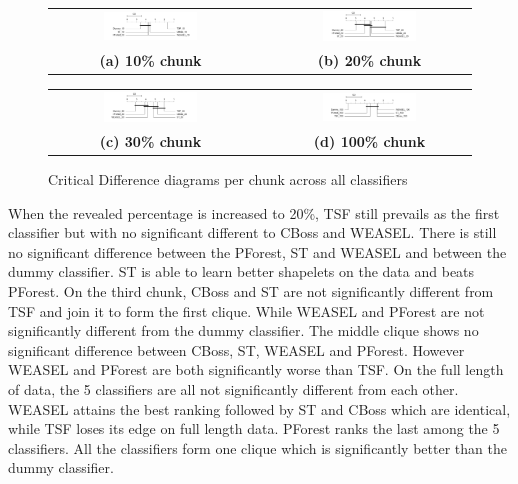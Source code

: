 \begin{figure} [!htb]
  \centering
  \begin{tabular}{ccc}
  \includegraphics[width=0.49\textwidth]{cd_f_score_across_10pct_with_dummy.png} & & 
  \includegraphics[width=0.49\textwidth]{cd_f_score_across_20pct_with_dummy.png} \\
  \textbf{(a) 10\% chunk} & & \textbf{(b) 20\% chunk} \\[6pt]
  \end{tabular}
  \begin{tabular}{ccc}
  \includegraphics[width=0.49\textwidth]{cd_f_score_across_30pct_with_dummy.png} & & 
  \includegraphics[width=0.49\textwidth]{cd_f_score_across_100pct_with_dummy.png} \\
  \textbf{(c) 30\% chunk} & & \textbf{(d) 100\% chunk}  \\[6pt]
  \end{tabular}
  \caption{Critical Difference diagrams per chunk across all classifiers}
  \label{fig:CDAcross}
\end{figure}

When the revealed percentage is increased to 20\%, TSF still prevails as the first classifier but with no significant different to CBoss and WEASEL.
There is still no significant difference between the PForest, ST and WEASEL and between the dummy classifier.
ST is able to learn better shapelets on the data and beats PForest.
On the third chunk, CBoss and ST are not significantly different from TSF and join it to form the first clique.
While WEASEL and PForest are not significantly different from the dummy classifier.
The middle clique shows no significant difference between CBoss, ST, WEASEL and PForest. However WEASEL and PForest are both significantly worse than TSF.
On the full length of data, the 5 classifiers are all not significantly different from each other.
WEASEL attains the best ranking followed by ST and CBoss which are identical, while TSF loses its edge on full length data.
PForest ranks the last among the 5 classifiers. All the classifiers form one clique which is significantly better than the dummy classifier.

